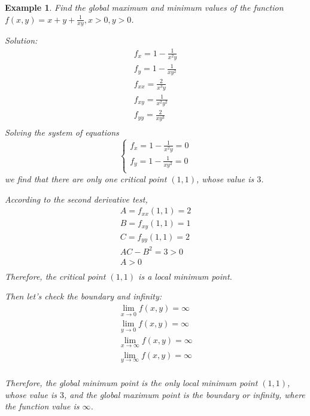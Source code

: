 \documentclass{article}
\newtheorem{example}{Example}
\begin{document}
\begin{example}
  Find the global maximum and minimum values of the function 
  $f(x, y) = x + y + \frac{1}{xy}, x > 0, y > 0$.

  Solution: \\
  \begin{gather*}
    f_x = 1 - \frac{1}{x^2y} \\
    f_y = 1 - \frac{1}{xy^2} \\
    f_{xx} = \frac{2}{x^3y} \\
    f_{xy} = \frac{1}{x^2y^2} \\
    f_{yy} = \frac{2}{xy^3} \\
  \end{gather*}
  Solving the system of equations
  \begin{equation*}
    \begin{cases}
      f_x = 1 - \frac{1}{x^2y} = 0 \\
      f_y = 1 - \frac{1}{xy^2} = 0 \\
    \end{cases}
  \end{equation*}
  we find that there are only one critical point $(1, 1)$, whose value is $3$.

  According to the second derivative test,
  \begin{gather*}
    A = f_{xx}(1, 1) = 2 \\
    B = f_{xy}(1, 1) = 1 \\
    C = f_{yy}(1, 1) = 2 \\
    AC - B^2 = 3 > 0 \\
    A > 0 \\
  \end{gather*}
  Therefore, the critical point $(1, 1)$ is a local minimum point. 
  
  Then let's check the boundary and infinity:
  \begin{gather*}
    \lim_{x \to 0}f(x, y) = \infty \\
    \lim_{y \to 0}f(x, y) = \infty \\
    \lim_{x \to \infty}f(x, y) = \infty \\
    \lim_{y \to \infty}f(x, y) = \infty \\
  \end{gather*}

  Therefore, the global minimum point is the only local minimum point $(1, 1)$, 
  whose value is $3$, and the global maximum point is the boundary or infinity, 
  where the function value is $\infty$.
\end{example}
\end{document}
